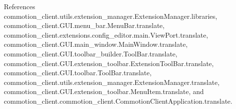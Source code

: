 References commotion\+\_\+client.\+utils.\+extension\+\_\+manager.\+Extension\+Manager.\+libraries, commotion\+\_\+client.\+G\+U\+I.\+menu\+\_\+bar.\+Menu\+Bar.\+translate, commotion\+\_\+client.\+extensions.\+config\+\_\+editor.\+main.\+View\+Port.\+translate, commotion\+\_\+client.\+G\+U\+I.\+main\+\_\+window.\+Main\+Window.\+translate, commotion\+\_\+client.\+G\+U\+I.\+toolbar\+\_\+builder.\+Tool\+Bar.\+translate, commotion\+\_\+client.\+G\+U\+I.\+extension\+\_\+toolbar.\+Extension\+Tool\+Bar.\+translate, commotion\+\_\+client.\+G\+U\+I.\+toolbar.\+Tool\+Bar.\+translate, commotion\+\_\+client.\+utils.\+extension\+\_\+manager.\+Extension\+Manager.\+translate, commotion\+\_\+client.\+G\+U\+I.\+extension\+\_\+toolbar.\+Menu\+Item.\+translate, and commotion\+\_\+client.\+commotion\+\_\+client.\+Commotion\+Client\+Application.\+translate.


